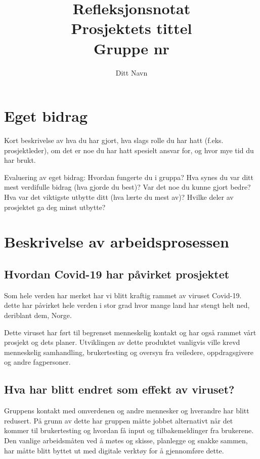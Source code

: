 \documentclass[11pt,a4paper]{report}
\begin{document}
\title{
Refleksjonsnotat \\
\vspace{2cm}
Prosjektets tittel\\
Gruppe nr
}
\author{
\LARGE 
Ditt Navn}
\maketitle

\section*{Eget bidrag}

Kort beskrivelse av hva du har gjort, hva slags rolle du har hatt (f.eks. prosjektleder), om det er noe du har hatt spesielt ansvar for, og hvor mye tid du har  brukt.

Evaluering av eget bidrag: Hvordan fungerte du i gruppa? Hva synes du var ditt mest verdifulle bidrag (hva gjorde du best)? Var det noe du kunne gjort bedre? Hva var det viktigste utbytte ditt (hva lærte du mest av)? Hvilke deler av prosjektet ga deg minst utbytte? 

\section{Beskrivelse av arbeidsprosessen}

\subsection{Hvordan Covid-19 har påvirket prosjektet}

Som hele verden har merket har vi blitt kraftig rammet av viruset Covid-19. dette har påvirket hele verden i stor grad hvor mange land har stengt helt ned, deriblant dem, Norge.

Dette viruset har ført til begrenset menneskelig kontakt og har også rammet vårt prosjekt og dets planer. Utviklingen av dette produktet vanligvis ville krevd menneskelig samhandling, brukertesting og oversyn fra veiledere, oppdragsgivere og andre fagpersoner.

\subsection{Hva har blitt endret som effekt av viruset?}

Gruppens kontakt med omverdenen og andre mennesker og hverandre har blitt redusert. På grunn av dette har gruppen måtte jobbet alternativt når det kommer til brukertesting og hvordan få input og tilbakemeldinger fra brukerene. Den vanlige arbeidsmåten ved å møtes og skisse, planlegge og snakke sammen, har måtte blitt byttet ut med digitale verktøy for å gjennomføre dette.
\end{document}
